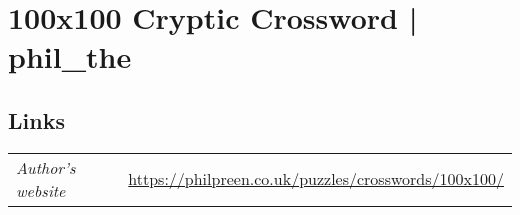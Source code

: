 \section[100x100 Cryptic Crossword | phil\_the {[\emph{Cryptic Crossword}]}]{100x100 Cryptic Crossword | {\normalfont phil\_the}}
\label{sec:07-100x100-cryptic-crossword-phil-the}

\subsection*{Links}
\begin{tabularx}{\textwidth}{l X}
\emph{Author's website} & \url{https://philpreen.co.uk/puzzles/crosswords/100x100/} \\
\end{tabularx}
\pagebreak
